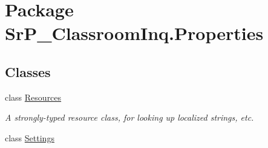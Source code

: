 \hypertarget{namespace_sr_p___classroom_inq_1_1_properties}{
\section{\-Package \-Sr\-P\-\_\-\-Classroom\-Inq.\-Properties}
\label{namespace_sr_p___classroom_inq_1_1_properties}
}
\subsection*{\-Classes}
\begin{DoxyCompactItemize}
\item 
class \hyperlink{class_sr_p___classroom_inq_1_1_properties_1_1_resources}{\-Resources}
\begin{DoxyCompactList}\small\item\em \-A strongly-\/typed resource class, for looking up localized strings, etc. \end{DoxyCompactList}\item 
class \hyperlink{class_sr_p___classroom_inq_1_1_properties_1_1_settings}{\-Settings}
\end{DoxyCompactItemize}
